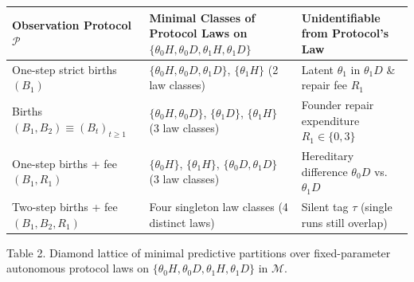 \documentclass[12pt,letterpaper]{article}
\newcounter{none}
\begin{document}
{\def\LTcaptype{none} %
\begin{longtable}[]{@{}
  >{\raggedright\arraybackslash}p{}
  >{\raggedright\arraybackslash}p{}
  >{\raggedright\arraybackslash}p{}@{}}
\toprule\noalign{}
\begin{minipage}[b]{\linewidth}\raggedright
Observation Protocol \(\mathcal{P}\)
\end{minipage} & \begin{minipage}[b]{\linewidth}\raggedright
Minimal Classes of Protocol Laws on
\(\{\theta_0 H, \theta_0 D, \theta_1 H, \theta_1 D\}\)
\end{minipage} & \begin{minipage}[b]{\linewidth}\raggedright
Unidentifiable from Protocol's Law
\end{minipage} \\
\midrule\noalign{}
\endhead
\bottomrule\noalign{}
\endlastfoot
One-step strict births \((B_1)\) &
\(\{\theta_0 H, \theta_0 D, \theta_1 D\}\), \(\{\theta_1 H\}\) (2 law
classes) & Latent \(\theta_1\) in \(\theta_1 D\) \& repair fee
\(R_1\) \\
Births \((B_1, B_2) \equiv (B_t)_{t\ge 1}\) &
\(\{\theta_0 H, \theta_0 D\}\), \(\{\theta_1 D\}\), \(\{\theta_1 H\}\)
(3 law classes) & Founder repair expenditure \(R_1 \in \{0,3\}\) \\
One-step births + fee \((B_1, R_1)\) & \(\{\theta_0 H\}\),
\(\{\theta_1 H\}\), \(\{\theta_0 D, \theta_1 D\}\) (3 law classes) &
Hereditary difference \(\theta_0 D\) vs.~\(\theta_1 D\) \\
Two-step births + fee \((B_1, B_2, R_1)\) & Four singleton law classes
(4 distinct laws) & Silent tag \(\tau\) (single runs still overlap) \\
\end{longtable}
}

Table 2. Diamond lattice of minimal predictive partitions over
fixed-parameter autonomous protocol laws on
\(\{\theta_0 H, \theta_0 D, \theta_1 H, \theta_1 D\}\) in
\(\mathcal{M}\).
\end{document}
